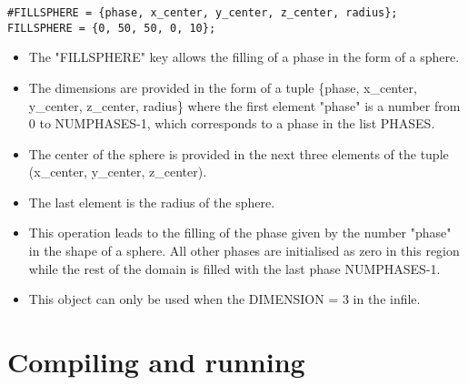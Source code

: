 \documentclass[a4paper,10pt]{article}
\begin{document}
\begin{lstlisting}
#FILLSPHERE = {phase, x_center, y_center, z_center, radius};
FILLSPHERE = {0, 50, 50, 0, 10};
\end{lstlisting}

\begin{itemize}
 \item The "FILLSPHERE" key allows the filling of a phase in the form of a sphere. 
 \item The dimensions are provided in the form of a tuple \{phase, x\_center, y\_center, z\_center, radius\}
 where the first element "phase" is a number from 0 to NUMPHASES-1, which corresponds to a phase in the list PHASES.
 \item The center of the sphere is provided in the next three elements of the tuple (x\_center, y\_center, z\_center).
 \item The last element is the radius of the sphere.
 \item This operation leads to the filling of the phase given by the number "phase" in the shape of a sphere. All other phases are initialised as zero in this region while the 
 rest of the domain is filled with the last phase NUMPHASES-1.
 \item This object can only be used when the DIMENSION = 3 in the infile.
\end{itemize}

\section{Compiling and running}
\end{document}
